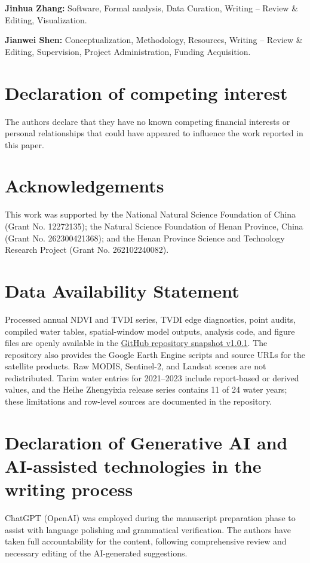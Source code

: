 \documentclass[preprint,review,12pt,3p]{elsarticle}
\begin{document}
	\textbf{Jinhua Zhang:} Software, Formal analysis, Data Curation, Writing -- Review \& Editing, Visualization.
	
	\textbf{Jianwei Shen:} Conceptualization, Methodology, Resources, Writing -- Review \& Editing, Supervision, Project Administration, Funding Acquisition.
	
	
	\section*{Declaration of competing interest}
	The authors declare that they have no known competing financial interests or personal relationships that could have appeared to influence the work reported in this paper.
	
	
	\section*{Acknowledgements}
	This work was supported by the National Natural Science Foundation of China (Grant No. 12272135); the Natural Science Foundation of Henan Province, China (Grant No. 262300421368); and the Henan Province Science and Technology Research Project (Grant No. 262102240082).
	
	
\section*{Data Availability Statement}

Processed annual NDVI and TVDI series, TVDI edge diagnostics, point audits,
compiled water tables, spatial-window model outputs, analysis code, and figure
files are openly available in the \href{https://github.com/PangYingxin-max/lower-tarim-pinn/tree/v1.0.1}{GitHub repository snapshot v1.0.1}.
The repository also provides the Google Earth Engine scripts and source URLs
for the satellite products. Raw MODIS, Sentinel-2, and Landsat scenes are not
redistributed. Tarim water entries for 2021--2023 include report-based or
derived values, and the Heihe Zhengyixia release series contains 11 of 24 water
years; these limitations and row-level sources are documented in the
repository.
	
	
	\section*{Declaration of Generative AI and AI-assisted technologies in the writing process}
	ChatGPT (OpenAI) was employed during the manuscript preparation phase to assist with language polishing and grammatical verification. The authors have taken full accountability for the content, following comprehensive review and necessary editing of the AI-generated suggestions.
	
	
	

	
\end{document}
